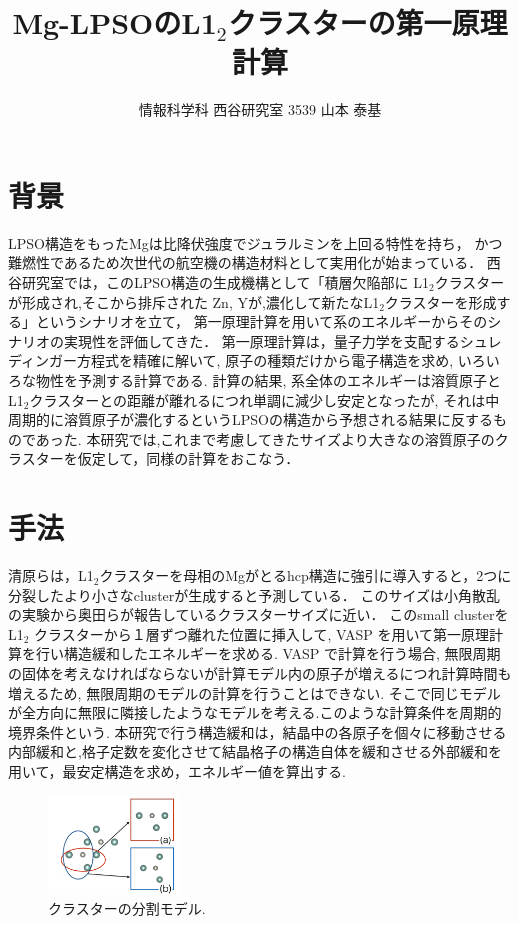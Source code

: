 \documentclass[a4j,twocolumn]{jsarticle}
\begin{document}
\title{Mg-LPSOのL1$_2$クラスターの第一原理計算}
\author{情報科学科 西谷研究室 3539 山本 泰基}
\date{}
\maketitle
\section{背景}
LPSO構造をもったMgは比降伏強度でジュラルミンを上回る特性を持ち，
かつ難燃性であるため次世代の航空機の構造材料として実用化が始まっている．
西谷研究室では，このLPSO構造の生成機構として「積層欠陥部に L1$_2$クラスターが形成され,そこから排斥された Zn, Yが,濃化して新たなL1$_2$クラスターを形成する」というシナリオを立て\cite{sakamoto}，
第一原理計算を用いて系のエネルギーからそのシナリオの実現性を評価してきた． 
第一原理計算は，量子力学を支配するシュレディンガー方程式を精確に解いて, 原子の種類だけから電子構造を求め, いろいろな物性を予測する計算である. 
計算の結果, 系全体のエネルギーは溶質原子とL1$_2$クラスターとの距離が離れるにつれ単調に減少し安定となったが, それは中周期的に溶質原子が濃化するというLPSOの構造から予想される結果に反するものであった. 
本研究では,これまで考慮してきたサイズより大きなの溶質原子のクラスターを仮定して，同様の計算をおこなう．


\section{手法}
清原らは，L1$_2$クラスターを母相のMgがとるhcp構造に強引に導入すると，2つに分裂したより小さなclusterが生成すると予測している\cite{kiyohara}．
このサイズは小角散乱の実験から奥田らが報告しているクラスターサイズに近い\cite{okuda}．
このsmall clusterをL1$_2$ クラスターから１層ずつ離れた位置に挿入して, VASP を用いて第一原理計算を行い構造緩和したエネルギーを求める. VASP で計算を行う場合, 無限周期の固体を考えなければならないが計算モデル内の原子が増えるにつれ計算時間も増えるため, 無限周期のモデルの計算を行うことはできない. そこで同じモデルが全方向に無限に隣接したようなモデルを考える.このような計算条件を周期的境界条件という.
本研究で行う構造緩和は，結晶中の各原子を個々に移動させる内部緩和と,格子定数を変化させて結晶格子の構造自体を緩和させる外部緩和を用いて，最安定構造を求め，エネルギー値を算出する.

\begin{figure}[htbp]
\begin{center}
\includegraphics[width=35mm]{MiniCluster.png}
\caption{クラスターの分割モデル.}
\label{default}
\end{center}
\end{figure}
\end{document}
